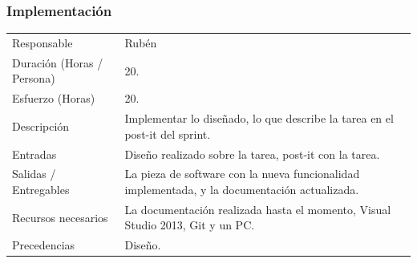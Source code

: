 \subsubsection{Implementaci\'{o}n}
\begin{table}[H]
    \begin{center}
        \begin{tabular}{l p{8cm}}
            Responsable                           & Rub\'{e}n \\
            Duraci\'{o}n (Horas / Persona)        & 20. \\ 
            Esfuerzo (Horas)                      & 20. \\
            Descripci\'{o}n                       & Implementar lo dise\~{n}ado, lo que describe la tarea en el post-it del sprint. \\
            Entradas                              & Dise\~{n}o realizado sobre la tarea, post-it con la tarea.\\
            Salidas / Entregables                 & La pieza de software con la nueva funcionalidad implementada, y la documentaci\'{o}n
                                                    actualizada. \\
            Recursos necesarios                   & La documentaci\'{o}n realizada hasta el momento, Visual Studio 2013, Git y un 
            										PC. \\
            Precedencias                          & Dise\~{n}o. \\
        \end{tabular}
    \end{center}
    
\end{table}

